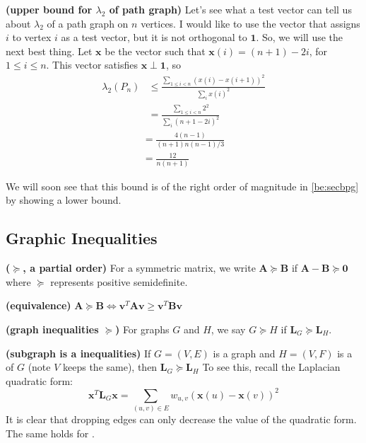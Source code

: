 \documentclass{article}
\newcommand{\bsl}[1]{\boldsymbol{#1}}
\newcommand{\bfs}[1]{\textbf{({#1}) }}
\begin{document}
\begin{exma}{\bfs{upper bound for $\lambda_2$ of path graph}}\label{be:pathlower}
Let's see what a test vector can tell us about $\lambda_{2}$ of a path graph on $n$ vertices. I would like to use the vector that assigns $i$ to vertex $i$ as a test vector, but it is not orthogonal to $\mathbf{1}$. So, we will use the next best thing. Let $\boldsymbol{x}$ be the vector such that $\boldsymbol{x}(i)=(n+1)-2 i$, for $1 \leq i \leq n$. This vector satisfies $\boldsymbol{x} \perp \mathbf{1}$, so
$$
\begin{aligned}
\lambda_{2}\left(P_{n}\right) & \leq \frac{\sum_{1 \leq i<n}(x(i)-x(i+1))^{2}}{\sum_{i} x(i)^{2}} \\
&=\frac{\sum_{1 \leq i<n} 2^{2}}{\sum_{i}(n+1-2 i)^{2}}
\end{aligned}
$$
$$
\begin{array}{l}
=\frac{4(n-1)}{(n+1) n(n-1) / 3} \\
=\frac{12}{n(n+1)}
\end{array}
$$

We will soon see that this bound is of the right order of magnitude in \cref{be:secbpg} by showing a lower bound.
\end{exma}

\subsection{Graphic Inequalities}
\begin{defa}{\bfs{$\succcurlyeq$, a partial order}}
For a symmetric matrix, we write 
$
\boldsymbol{A} \succcurlyeq \boldsymbol{B}
$
if
$
\boldsymbol{A}-\boldsymbol{B} \succcurlyeq \mathbf{0}
$
where $\succcurlyeq$ represents positive semidefinite.
\end{defa}
\begin{rema}{\bfs{equivalence}}
$ \boldsymbol{A} \succcurlyeq \boldsymbol{B} \Longleftrightarrow \bsl{v}^T \boldsymbol{A}\bsl{v} \ge \bsl{v}^T\boldsymbol{B}\bsl{v}$
\end{rema}

\begin{defa}{\bfs{graph inequalities $\succcurlyeq$}}
For graphs $G$ and $H$, we say $ G \succcurlyeq H $ if $\boldsymbol{L}_{G} \succcurlyeq \boldsymbol{L}_{H}$. 
\end{defa}
\begin{rema}{\bfs{subgraph is a inequalities}}
If $G=(V, E)$ is a graph and $H=(V, F)$ is a  of $G$ (note  $V$ keeps the same), then $ \boldsymbol{L}_{G} \succcurlyeq \boldsymbol{L}_{H} $
To see this, recall the Laplacian quadratic form:
$$
\boldsymbol{x}^{T} \boldsymbol{L}_{G} \boldsymbol{x}=\sum_{(u, v) \in E} w_{u, v}(\boldsymbol{x}(u)-\boldsymbol{x}(v))^{2}
$$
It is clear that dropping edges can only decrease the value of the quadratic form. The same holds for .
\end{rema}
\end{document}
